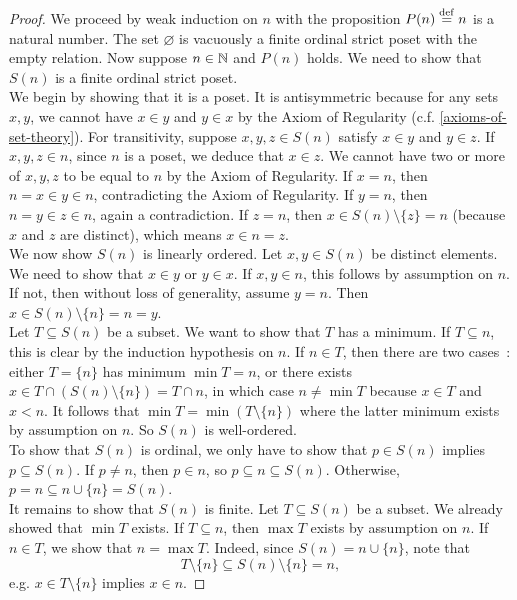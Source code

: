 \begin{proof}
    We proceed by weak induction on $n$ with the proposition $P(n) \overset{\mathrm{def}}{=} n$ is a natural number. The set $\varnothing$ is vacuously a finite ordinal strict poset with the empty relation. Now suppose $n \in \operatorname{\mathbb N}$ and $P(n)$ holds. We need to show that $S(n)$ is a finite ordinal strict poset. 
    \\

    We begin by showing that it is a poset. It is antisymmetric because for any sets $x,y$, we cannot have $x \in y$ and $y \in x$ by the Axiom of Regularity (c.f. \autoref{axioms-of-set-theory}). For transitivity, suppose $x,y,z \in S(n)$ satisfy $x \in y$ and $y \in z$. If $x,y,z \in n$, since $n$ is a poset, we deduce that $x \in z$. We cannot have two or more of $x,y,z$ to be equal to $n$ by the Axiom of Regularity. If $x = n$, then $n = x \in y \in n$, contradicting the Axiom of Regularity. If $y = n$, then $n = y \in z \in n$, again a contradiction. If $z = n$, then $x \in S(n) \setminus \{z\} = n$ (because $x$ and $z$ are distinct), which means $x \in n = z$.
    \\

    We now show $S(n)$ is linearly ordered. Let $x,y \in S(n)$ be distinct elements. We need to show that $x \in y$ or $y \in x$. If $x,y \in n$, this follows by assumption on $n$. If not, then without loss of generality, assume $y = n$. Then $x \in S(n) \setminus \{n\} = n = y$.
    \\

    Let $T \subseteq S(n)$ be a subset. We want to show that $T$ has a minimum. If $T \subseteq n$, this is clear by the induction hypothesis on $n$. If $n \in T$, then there are two cases~: either $T = \{n\}$ has minimum $\min T = n$, or there exists $x \in T \cap (S(n) \setminus \{n\}) = T \cap n$, in which case $n \neq \min T$ because $x \in T$ and $x < n$. It follows that $\min T = \min(T \setminus \{n\})$ where the latter minimum exists by assumption on $n$. So $S(n)$ is well-ordered.
    \\

    To show that $S(n)$ is ordinal, we only have to show that $p \in S(n)$ implies $p \subseteq S(n)$. If $p \neq n$, then $p \in n$, so $p \subseteq n \subseteq S(n)$. Otherwise, $p = n \subseteq n \cup \{n\} = S(n)$. 
    \\

    It remains to show that $S(n)$ is finite. Let $T \subseteq S(n)$ be a subset. We already showed that $\min T$ exists. If $T \subseteq n$, then $\max T$ exists by assumption on $n$. If $n \in T$, we show that $n = \max T$. Indeed, since $S(n) = n \cup \{n\}$, note that
    \[
        T \setminus \{n\} \subseteq S(n) \setminus \{n\} = n,
    \]
    e.g. $x \in T \setminus \{n\}$ implies $x \in n$.
\end{proof}

